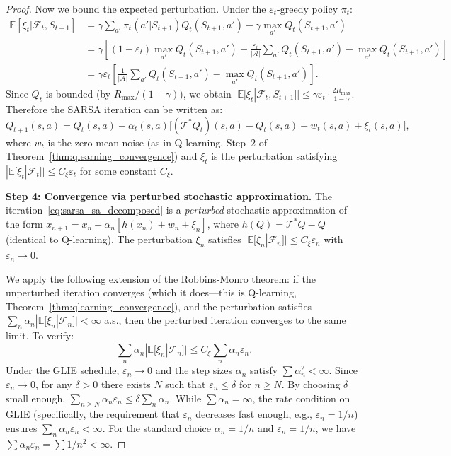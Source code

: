 \documentclass[11pt,a4paper]{article}
\theoremstyle{definition}
\theoremstyle{plain}
\theoremstyle{remark}
\newcommand{\E}{\mathbb{E}}
\begin{document}
\begin{proof}
Now we bound the expected perturbation. Under the $\varepsilon_t$-greedy policy $\pi_t$:
\begin{align}
    \E[\xi_t | \mathcal{F}_t, S_{t+1}]
    &= \gamma\sum_{a'}\pi_t(a'|S_{t+1})Q_t(S_{t+1},a') - \gamma\max_{a'}Q_t(S_{t+1},a') \nonumber\\
    &= \gamma\!\left[(1-\varepsilon_t)\max_{a'}Q_t(S_{t+1},a') + \frac{\varepsilon_t}{|\mathcal{A}|}\sum_{a'}Q_t(S_{t+1},a') - \max_{a'}Q_t(S_{t+1},a')\right] \nonumber\\
    &= \gamma\varepsilon_t\!\left[\frac{1}{|\mathcal{A}|}\sum_{a'}Q_t(S_{t+1},a') - \max_{a'}Q_t(S_{t+1},a')\right]. \label{eq:xi_bound}
\end{align}
Since $Q_t$ is bounded (by $R_{\max}/(1-\gamma)$), we obtain $|\E[\xi_t | \mathcal{F}_t, S_{t+1}]| \leq \gamma\varepsilon_t \cdot \frac{2R_{\max}}{1-\gamma}$. Therefore the SARSA iteration can be written as:
\begin{equation}
    Q_{t+1}(s,a) = Q_t(s,a) + \alpha_t(s,a)\bigl[(\mathcal{T}^* Q_t)(s,a) - Q_t(s,a) + w_t(s,a) + \xi_t(s,a)\bigr],
    \label{eq:sarsa_sa_decomposed}
\end{equation}
where $w_t$ is the zero-mean noise (as in Q-learning, Step~2 of Theorem~\ref{thm:qlearning_convergence}) and $\xi_t$ is the perturbation satisfying $|\E[\xi_t | \mathcal{F}_t]| \leq C_\xi \varepsilon_t$ for some constant $C_\xi$.

\textbf{Step 4: Convergence via perturbed stochastic approximation.} The iteration~\eqref{eq:sarsa_sa_decomposed} is a \emph{perturbed} stochastic approximation of the form $x_{n+1} = x_n + \alpha_n[h(x_n) + w_n + \xi_n]$, where $h(Q) = \mathcal{T}^* Q - Q$ (identical to Q-learning). The perturbation $\xi_n$ satisfies $|\E[\xi_n | \mathcal{F}_n]| \leq C_\xi\varepsilon_n$ with $\varepsilon_n \to 0$.

We apply the following extension of the Robbins-Monro theorem: if the unperturbed iteration converges (which it does---this is Q-learning, Theorem~\ref{thm:qlearning_convergence}), and the perturbation satisfies $\sum_n \alpha_n |\E[\xi_n|\mathcal{F}_n]| < \infty$ a.s., then the perturbed iteration converges to the same limit. To verify:
\begin{equation}
    \sum_n \alpha_n |\E[\xi_n|\mathcal{F}_n]| \leq C_\xi \sum_n \alpha_n \varepsilon_n.
    \label{eq:perturbation_summable}
\end{equation}
Under the GLIE schedule, $\varepsilon_n \to 0$ and the step sizes $\alpha_n$ satisfy $\sum \alpha_n^2 < \infty$. Since $\varepsilon_n \to 0$, for any $\delta > 0$ there exists $N$ such that $\varepsilon_n \leq \delta$ for $n \geq N$. By choosing $\delta$ small enough, $\sum_{n \geq N} \alpha_n \varepsilon_n \leq \delta\sum_n \alpha_n$. While $\sum \alpha_n = \infty$, the rate condition on GLIE (specifically, the requirement that $\varepsilon_n$ decreases fast enough, e.g., $\varepsilon_n = 1/n$) ensures $\sum_n \alpha_n \varepsilon_n < \infty$. For the standard choice $\alpha_n = 1/n$ and $\varepsilon_n = 1/n$, we have $\sum \alpha_n\varepsilon_n = \sum 1/n^2 < \infty$.


\end{proof}
\end{document}

